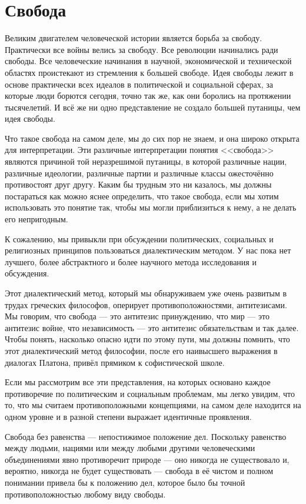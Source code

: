 \chapter{Свобода}

Великим двигателем человеческой истории является борьба за свободу. Практически все войны велись за свободу. Все революции начинались ради свободы. Все человеческие начинания в научной, экономической и технической областях проистекают из стремления к большей свободе. Идея свободы лежит в основе практически всех идеалов в политической и социальной сферах, за которые люди борются сегодня, точно так же, как они боролись на протяжении тысячелетий. И всё же ни одно представление не создало большей путаницы, чем идея свободы.
 
Что такое свобода на самом деле, мы до сих пор не знаем, и она широко открыта для интерпретации. Эти различные интерпретации понятия <<свобода>> являются причиной той неразрешимой путаницы, в которой различные нации, различные идеологии, различные партии и различные классы ожесточённо противостоят друг другу. Каким бы трудным это ни казалось, мы должны постараться как можно яснее определить, что такое свобода, если мы хотим использовать это понятие так, чтобы мы могли приблизиться к нему, а не делать его непригодным.
 
К сожалению, мы привыкли при обсуждении политических, социальных и религиозных принципов пользоваться диалектическим методом. У нас пока нет лучшего, более абстрактного и более научного метода исследования и обсуждения.
 
Этот диалектический метод, который мы обнаруживаем уже очень развитым в трудах греческих философов, оперирует противоположностями, антитезисами. Мы говорим, что свобода — это антитезис принуждению, что мир — это антитезис войне, что независимость — это антитезис обязательствам и так далее. Чтобы понять, насколько опасно идти по этому пути, мы должны помнить, что этот диалектический метод философии, после его наивысшего выражения в диалогах Платона, привёл прямиком к софистической школе.

Если мы рассмотрим все эти представления, на которых основано каждое противоречие по политическим и социальным проблемам, мы легко увидим, что то, что мы считаем противоположными концепциями, на самом деле находится на одном уровне и в разной степени выражает идентичные проявления.
 
Свобода без равенства — непостижимое положение дел. Поскольку равенство между людьми, нациями или между любыми другими человеческими объединениями явно противоречит природе — оно никогда не существовало и, вероятно, никогда не будет существовать — свобода в её чистом и полном понимании привела бы к положению дел, которое было бы точной противоположностью любому виду свободы.
 
